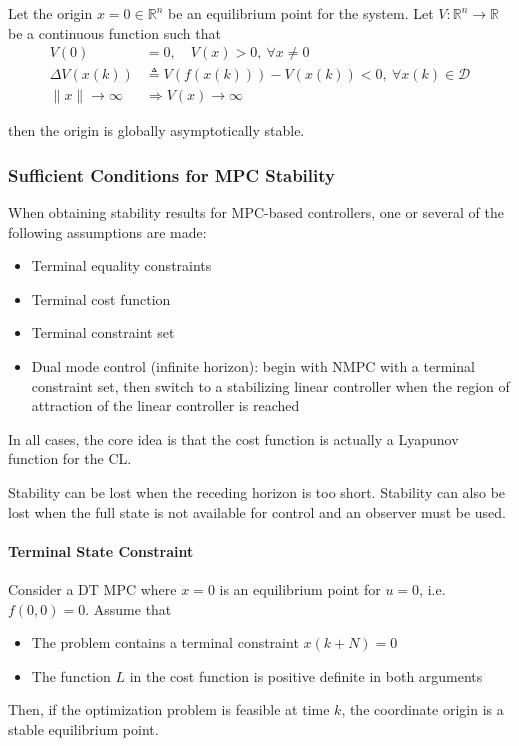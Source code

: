 \newpar{}

Let the origin $x = 0 \in \mathbb{R}^n$ be an equilibrium point for the system. Let $V: \mathbb{R}^n \to \mathbb{R}$ be a continuous function such that
\begin{align*}
    V(0)             & = 0, \quad V(x) > 0, \ \forall x \neq 0                             \\
    \Delta V(x(k))   & \triangleq V(f(x(k))) - V(x(k)) < 0, \ \forall x(k) \in \mathcal{D} \\
    \|x\| \to \infty & \Rightarrow V(x) \to \infty
\end{align*}

then the origin is globally asymptotically stable.

\subsubsection{Sufficient Conditions for MPC Stability}

When obtaining stability results for MPC-based controllers, one or several of the following assumptions are made:
\begin{itemize}
    \item Terminal equality constraints
    \item Terminal cost function
    \item Terminal constraint set
    \item Dual mode control (infinite horizon): begin with NMPC with a terminal constraint set, then switch to a stabilizing linear controller when the region of attraction of the linear controller is reached
\end{itemize}

In all cases, the core idea is that the cost function is actually a Lyapunov function for the CL.
\newpar{}

Stability can be lost when the receding horizon is too short. Stability can also be lost when the full state is not available for control and an observer must be used.

\paragraph{Terminal State Constraint}

Consider a DT MPC where $x = 0$ is an equilibrium point for $u = 0$, i.e. $f(0, 0) = 0$. Assume that
\begin{itemize}
    \item The problem contains a terminal constraint $x(k + N) = 0$
    \item The function $L$ in the cost function is positive definite in both arguments
\end{itemize}

Then, if the optimization problem is feasible at time $k$, the coordinate origin is a stable equilibrium point.
